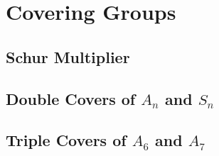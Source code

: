 \documentclass[a4paper,11pt]{article}
\def\maintitle#1{\section*{#1}}
\def\subtitle#1{\section{#1}}
\begin{document}
\else %
    \ifx\chaptitle\undefined %
        \def\maintitle#1{\subsection{#1}}
        \def\subtitle#1{\subsubsection{#1}}
    \else %
        \def\maintitle#1{\section{#1}}
        \def\subtitle#1{\subsection{#1}}
    \fi
\fi

\maintitle{Covering Groups}
\subtitle{Schur Multiplier}
\subtitle{Double Covers of $A_n$ and $S_n$}
\subtitle{Triple Covers of $A_6$ and $A_7$}




\ifx\ChapTwoSecSeven\undefined %
     
\end{document}
